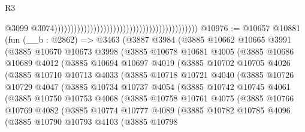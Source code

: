 \begin{lexlean}{R3}
\begin{coremodule}
                                                                                            @3099
                                                                                            @3074))))))))))))))))))))))))))))))))))))))))))))
@10976 := @10657
    @10881
    (fun (__b : @2862) =>
    @3463
      (@3887
        @3984
        (@3885
          @10662
          @10665
          @3991
          (@3885
            @10670
            @10673
            @3998
            (@3885
              @10678
              @10681
              @4005
              (@3885
                @10686
                @10689
                @4012
                (@3885
                  @10694
                  @10697
                  @4019
                  (@3885
                    @10702
                    @10705
                    @4026
                    (@3885
                      @10710
                      @10713
                      @4033
                      (@3885
                        @10718
                        @10721
                        @4040
                        (@3885
                          @10726
                          @10729
                          @4047
                          (@3885
                            @10734
                            @10737
                            @4054
                            (@3885
                              @10742
                              @10745
                              @4061
                              (@3885
                                @10750
                                @10753
                                @4068
                                (@3885
                                  @10758
                                  @10761
                                  @4075
                                  (@3885
                                    @10766
                                    @10769
                                    @4082
                                    (@3885
                                      @10774
                                      @10777
                                      @4089
                                      (@3885
                                        @10782
                                        @10785
                                        @4096
                                        (@3885
                                          @10790
                                          @10793
                                          @4103
                                          (@3885
                                            @10798

\end{coremodule}
\end{lexlean}
